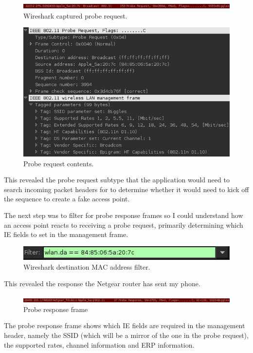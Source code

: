 \begin{figure}[h!]
\includegraphics[width=\linewidth]{research/80211/figures/bt3.png}
\caption{Wireshark captured probe request.}
\label{research:80211:bt3}
\end{figure}

\begin{figure}[h!]
\includegraphics[width=\linewidth]{research/80211/figures/bt4.png}
\caption{Probe request contents.}
\label{research:80211:bt4}
\end{figure}
\newpage
This revealed the probe request subtype that the application would need to search incoming packet headers for to determine whether it would need to kick off the sequence to create a fake access point.

The next step was to filter for probe response frames so I could understand how an access point reacts to receiving a probe request, primarily determining which IE fields to set in the management frame.

\begin{figure}[h!]
\includegraphics[width=\linewidth]{research/80211/figures/bt5.png}
\caption{Wireshark destination MAC address filter.}
\label{research:80211:bt5}
\end{figure}

This revealed the response the Netgear router has sent my phone.

\begin{figure}[h!]
\includegraphics[width=\linewidth]{research/80211/figures/bt6.png}
\caption{Probe response frame}
\label{research:80211:bt6}
\end{figure}
\newpage
The probe response frame shows which IE fields are required in the management header, namely the SSID (which will be a mirror of the one in the probe request), the supported rates, channel information and ERP information. 

